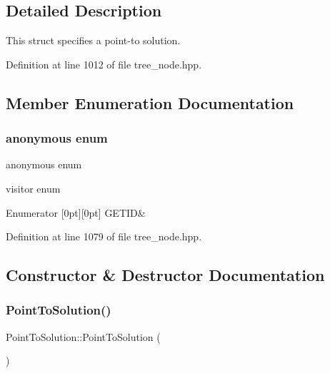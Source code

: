 \subsection{Detailed Description}
This struct specifies a point-\/to solution. 

Definition at line 1012 of file tree\+\_\+node.\+hpp.



\subsection{Member Enumeration Documentation}
\mbox{\label{structPointToSolution_a69aac44226f7ed696f4104da41f1639c}} 
\subsubsection{\texorpdfstring{anonymous enum}{anonymous enum}}
{\footnotesize\ttfamily anonymous enum}



visitor enum 

\begin{DoxyEnumFields}{Enumerator}
[0pt][0pt]{}\mbox{\label{structPointToSolution_a69aac44226f7ed696f4104da41f1639ca779657052580aac4c864acf56978b0b1}} 
G\+E\+T\+ID&\\
\hline

\end{DoxyEnumFields}


Definition at line 1079 of file tree\+\_\+node.\+hpp.



\subsection{Constructor \& Destructor Documentation}
\mbox{\label{structPointToSolution_a245e8221f21315da8cb550bac8842887}} 
\subsubsection{\texorpdfstring{Point\+To\+Solution()}{PointToSolution()}}
{\footnotesize\ttfamily Point\+To\+Solution\+::\+Point\+To\+Solution (\begin{DoxyParamCaption}{ }\end{DoxyParamCaption})}




